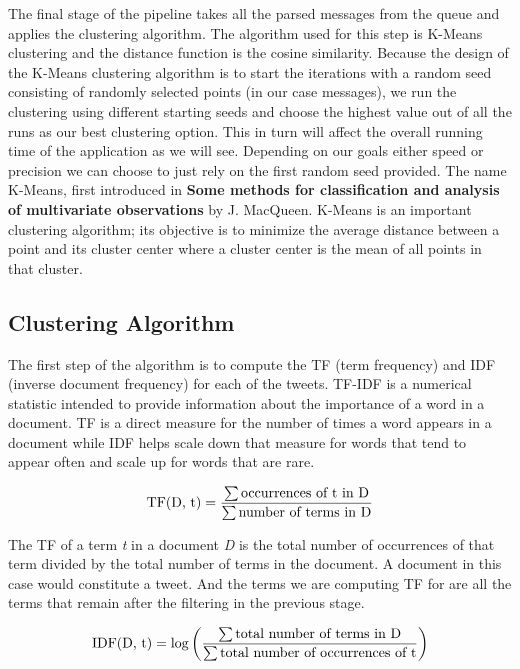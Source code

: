 The final stage of the pipeline takes all the parsed messages from the queue and applies the clustering algorithm. The algorithm used for this step is K-Means clustering and the distance function is the cosine similarity. Because the design of the K-Means clustering algorithm is to start the iterations with a random seed consisting of randomly selected points (in our case messages), we run the clustering using different starting seeds and choose the highest value out of all the runs as our best clustering option. This in turn will affect the overall running time of the application as we will see. Depending on our goals either speed or precision we can choose to just rely on the first random seed provided.
The name K-Means, first introduced in \textbf{Some methods for classification and analysis of multivariate observations} by J. MacQueen. K-Means is an important clustering algorithm; its objective is to minimize the average distance between a point and its cluster center where a cluster center is the mean of all points in that cluster.

\subsection{Clustering Algorithm}
\label{clusteringalgorithm}

The first step of the algorithm is to compute the TF  (term frequency) and IDF  (inverse document frequency) for each of the tweets. TF-IDF is a numerical statistic intended to provide information about the importance of a word in a document. TF is a direct measure for the number of times a word appears in a document while IDF helps scale down that measure for words that tend to appear often and scale up for words that are rare.

\begin{equation}
	\text{TF(D, t)} = {\sum \textrm{occurrences of t in D} \over
						\sum \textrm{number of terms in D}}
\end{equation}

The TF of a term \textit{t} in a document \textit{D} is the total number of occurrences of that term divided by the total number of terms in the document. A document in this case would constitute a tweet. And the terms we are computing TF for are all the terms that remain after the filtering in the previous stage.

\begin{equation}
	\text{IDF(D, t)} = { \log \bigg( {\sum \textrm{total number of terms in D} \over
						\sum \textrm{total number of occurrences of t}} \bigg) }	
\end{equation}

